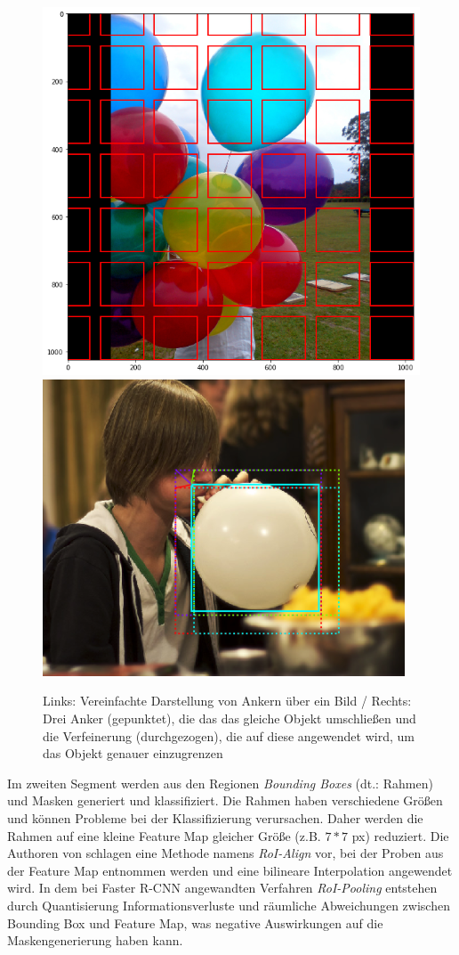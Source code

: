 \begin{figure}[ht]
  \centering
  \includegraphics[width=.45\textwidth]{pics/rpn-anchors.png}
  \includegraphics[width=.45\textwidth]{pics/rpn-refinement.png}
  \caption[RPN-Anker]{Links: Vereinfachte Darstellung von Ankern über ein Bild\cite{ref:matterport:maskrcnn} / Rechts: Drei Anker (gepunktet), die das das gleiche Objekt umschließen und die Verfeinerung (durchgezogen), die auf diese angewendet wird, um das Objekt genauer einzugrenzen\cite{ref:matterport:maskrcnn}}
  \label{fig:rpn}
\end{figure}
\noindent
Im zweiten Segment werden aus den Regionen \textit{Bounding Boxes} (dt.: Rahmen) und Masken generiert und klassifiziert. Die Rahmen haben verschiedene Größen und können Probleme bei der Klassifizierung verursachen. Daher werden die Rahmen auf eine kleine Feature Map gleicher Größe (z.B. $7*7$ px) reduziert. Die Authoren von \cite{ref:maskrcnn} schlagen eine Methode namens \textit{RoI-Align} vor, bei der Proben aus der Feature Map entnommen werden und eine bilineare Interpolation angewendet wird. In dem bei Faster R-CNN angewandten Verfahren \textit{RoI-Pooling} entstehen durch Quantisierung Informationsverluste und räumliche Abweichungen zwischen Bounding Box und Feature Map, was negative Auswirkungen auf die Maskengenerierung haben kann.\cite{ref:maskrcnn}
\\\\

